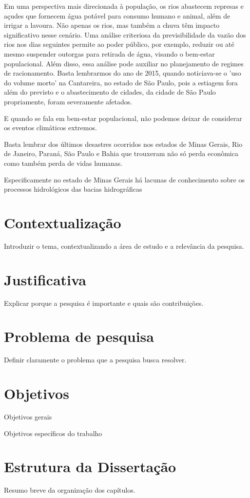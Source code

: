 Em uma perspectiva mais direcionada à população, os rios abastecem represas e açudes que fornecem água potável para consumo humano e animal, além de irrigar a lavoura. Não apenas os rios, mas também a chuva têm impacto significativo nesse cenário. Uma análise criteriosa da previsibilidade da vazão dos rios nos dias seguintes permite ao poder público, por exemplo, reduzir ou até mesmo suspender outorgas para retirada de água, visando o bem-estar populacional. Além disso, essa análise pode auxiliar no planejamento de regimes de racionamento. Basta lembrarmos do ano de 2015, quando noticiava-se o 'uso do volume morto' na Cantareira, no estado de São Paulo, pois a estiagem fora além do previsto e o abastecimento de cidades, da cidade de São Paulo propriamente, foram severamente afetados.\cite{g1_cantareira_2015}

E quando se fala em bem-estar populacional, não podemos deixar de considerar os eventos climáticos extremos. 


Basta lembrar dos últimos desastres ocorridos nos estados de Minas Gerais, Rio de Janeiro, Paraná, São Paulo e Bahia que trouxeram não só perda econômica como também perda de vidas humanas. \cite{bbc_chuvas_bahia_2024} \cite{cnn_temporais_mg_2024} \cite{g1_temporal_es_2024} \cite{g1_temporal_petropolis_2022}

Especificamente no estado de Minas Gerais há lacunas de conhecimento sobre os processos hidrológicos das bacias hidrográficas

\section{Contextualização}
Introduzir o tema, contextualizando a área de estudo e a relevância da pesquisa.

\section{Justificativa}
Explicar porque a pesquisa é importante e quais são contribuições.

\section{Problema de pesquisa}
Definir claramente o problema que a pesquisa busca resolver.

\section{Objetivos}
Objetivos gerais

Objetivos específicos do trabalho

\section{Estrutura da Dissertação}
Resumo breve da organização dos capítulos.